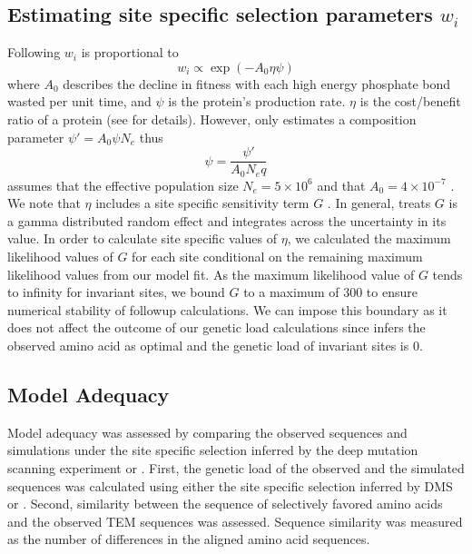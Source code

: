 \documentclass[fleqn,letterpaper]{article}
\begin{document}
\subsection{Estimating site specific selection parameters $w_i$}

Following \citet{beaulieu2019} $w_i$ is proportional to
\begin{equation}
w_i \propto \exp(-A_0\eta\psi)
\end{equation}
where $A_0$ describes the decline in fitness with each high energy phosphate bond wasted per unit time, and $\psi$ is the protein's production rate.
$\eta$ is the cost/benefit ratio of a protein (see \citet{beaulieu2019} for details). 
However, \selac only estimates a composition parameter $\psi' = A_0\psi N_e$ thus
\begin{equation}
\psi = \frac{\psi'}{A_0N_eq}
\end{equation}
\selac assumes that the effective population size $N_e = 5\times 10^6$ and that $A_0 = 4 \times 10^{-7}$ \citep{gilchrist2007}.
We note that $\eta$ includes a site specific sensitivity term $G$ \citep{beaulieu2019}.
In general, \selac treats $G$ is a gamma distributed random effect and integrates across the uncertainty in its value.
In order to calculate site specific values of $\eta$, we calculated the maximum likelihood values of $G$ for each site conditional on the remaining maximum likelihood values from our \selac model fit.
As the maximum likelihood value of $G$ tends to infinity for invariant sites, we bound $G$ to a maximum of 300 to ensure numerical stability of followup calculations.
We can impose this boundary as it does not affect the outcome of our genetic load calculations since \selac infers the observed amino acid as optimal and the genetic load of invariant sites is 0.
\subsection{Model Adequacy}

Model adequacy was assessed by comparing the observed sequences and simulations under the site specific selection inferred by the deep mutation scanning experiment or \selac.
First, the genetic load of the observed and the simulated sequences was calculated using either the site specific selection inferred by DMS or \selac.
Second, similarity between the sequence of selectively favored amino acids and the observed TEM sequences was assessed.
Sequence similarity was measured as the number of differences in the aligned amino acid sequences.
\end{document}
